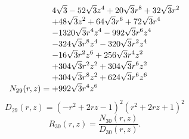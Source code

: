 \documentclass[11pt,a4paper]{article}
\begin{document}
\begin{equation}
N_{29}(r,z)=\shortstack[l]{$\displaystyle 4 \sqrt{3} - 52 \sqrt{3} z^{4} + 20 \sqrt{3} r^{8} + 32 \sqrt{3} r^{2}$\\
$\displaystyle  + 48 \sqrt{3} z^{2} + 64 \sqrt{3} r^{6} + 72 \sqrt{3} r^{4}$\\
$\displaystyle  - 1320 \sqrt{3} r^{4} z^{4} - 992 \sqrt{3} r^{6} z^{4}$\\
$\displaystyle  - 324 \sqrt{3} r^{8} z^{4} - 320 \sqrt{3} r^{2} z^{4}$\\
$\displaystyle  - 16 \sqrt{3} r^{2} z^{6} + 256 \sqrt{3} r^{4} z^{2}$\\
$\displaystyle  + 304 \sqrt{3} r^{2} z^{2} + 304 \sqrt{3} r^{6} z^{2}$\\
$\displaystyle  + 304 \sqrt{3} r^{8} z^{2} + 624 \sqrt{3} r^{6} z^{6}$\\
$\displaystyle  + 992 \sqrt{3} r^{4} z^{6}$}
\label{eq:cat-numerator-29}
\end{equation}
\begin{equation}
D_{29}(r,z)=\left(- r^{2} + 2 r z - 1\right)^{2} \left(r^{2} + 2 r z + 1\right)^{2}
\label{eq:cat-denominator-29}
\end{equation}
\begin{equation}
R_{30}(r,z)=\frac{N_{30}(r,z)}{D_{30}(r,z)}.
\label{eq:cat-rational-30}
\end{equation}
\end{document}
